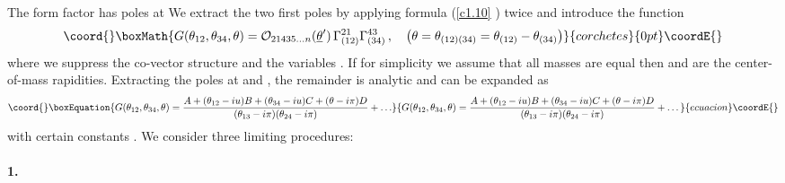 \documentclass[a4paper,a4paper]{article}
\begin{document}
The form factor \coordHE{} has poles
at \coordHE{} We extract the two first poles by applying formula (\ref{c1.10}%
) twice and introduce the function 
\[\coord{}\boxMath{
G(\theta _{12},\theta _{34},\theta )=\mathcal{O}_{21435\dots n}(\underline{%
\theta }^{\prime })\,\Gamma _{(12)}^{21}\Gamma _{(34)}^{43}\,,\quad \left(
\theta =\theta _{(12)(34)}=\theta _{(12)}-\theta _{(34)}\right) 
}{corchetes}{0pt}\coordE{}\]
where we suppress the co-vector structure and the variables \coordHE{}. If for simplicity we assume that all masses are
equal then \coordHE{} and \coordHE{} are the center-of-mass
rapidities. Extracting the poles at \coordHE{} and \coordHE{}, the remainder is analytic and can be expanded as 
\begin{equation}\coord{}\boxEquation{
G(\theta _{12},\theta _{34},\theta )=\frac{A+(\theta _{12}-iu)B+(\theta
_{34}-iu)C+(\theta -i\pi )D}{(\theta _{13}-i\pi )(\theta _{24}-i\pi )}+\dots
\label{c1.20}
}{
G(\theta _{12},\theta _{34},\theta )=\frac{A+(\theta _{12}-iu)B+(\theta
_{34}-iu)C+(\theta -i\pi )D}{(\theta _{13}-i\pi )(\theta _{24}-i\pi )}+\dots
}{ecuacion}\coordE{}\end{equation}
with certain constants \coordHE{}. We consider three limiting procedures:

\paragraph{1.}
\end{document}
